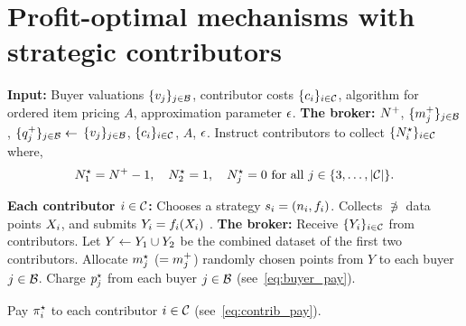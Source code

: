 \section{Profit-optimal mechanisms with strategic contributors}

\label{sec:mechanism}
\newcommand{\insertalgotab}{\hspace{0.6cm}}

\begin{algorithm}[H] 
    \caption{\label{alg:mechanism}}
    \begin{algorithmic}[1]
        \State
        {\bfseries Input:} Buyer valuations $\{v_{j}\}_{j\in\mathcal{B}}$, contributor costs $\{c_i\}_{i\in\mathcal{C}}$, algorithm for ordered item pricing $A$, approximation
            parameter $\epsilon$. %
        \State
        \textbf{The broker: }
        \State \insertalgotab $N^{+}$, $\{m_{j}^{+}\}_{j\in\mathcal{B}}$, $\{q_j^{+}\}_{j\in\mathcal{B}} \leftarrow$  $\{v_{j}\}_{j\in\mathcal{B}}$, $\{c_i\}_{i\in\mathcal{C}}$, $A$, $\epsilon$.   
        \State \insertalgotab Instruct contributors to collect $\{N^\star_i\}_{i\in\mathcal{C}}$ where,
        \[
                N^\star_1 = N^{+}-1, \quad N^\star_2 = 1, \quad N^\star_j = 0 \text{ for all } j\in \{3,\dots,|\mathcal{C}|\}.
        \]
      
        \State
        \textbf{Each contributor $i \in \mathcal{C}$:}
        \State
        \insertalgotab
         Chooses a strategy $s_i = (n_i, f_i)$. 
        \State 
        \insertalgotab
         Collects $\nni$ data points $X_{i}$, and submits $Y_{i} = f_i(X_{i})$ . 
        \State
        \textbf{The broker:}
        \State 
        \insertalgotab   Receive  $\{Y_{i}\}_{i\in\mathcal{C}}$ from contributors.
        \State \insertalgotab Let   $Y \leftarrow Y_1 \cup Y_2$ be the combined dataset of the first two contributors.
        \State
        \insertalgotab Allocate  $m^\star_j$ ($=m_{j}^{+}$) randomly chosen points from $Y$ to each buyer $j \in \mathcal{B}$.
        \State \insertalgotab Charge $p^\star_j$ from each buyer $j\in\mathcal{B}$ (see~\eqref{eq:buyer_pay}).

        \State
        \insertalgotab Pay $\pi^\star_i$ to each contributor $i \in \mathcal{C}$ (see~\eqref{eq:contrib_pay}).
   \end{algorithmic}   
\end{algorithm}


